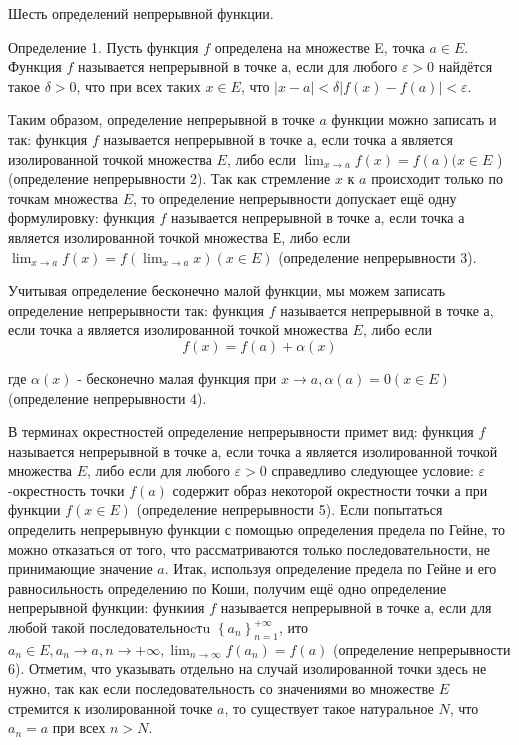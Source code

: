 \newpage
\begin{problem}
Шесть определений непрерывной функции.
\end{problem}
Определение 1. Пусть функция $f$ определена на множестве E, точка $a \in E$. Функция $f$ называется непрерывной в точке $а$, если для любого $\varepsilon>0$ найдётся такое $\delta>0$, что при всех таких $x \in E$, что $|x-a|<\delta|f(x)-f(a)|<\varepsilon$.

Таким образом, определение непрерывной в точке $a$ функции можно записать и так: функция $f$ называется непрерывной в точке а, если точка а является изолированной точкой множества $E$, либо если $\lim _{x \rightarrow a} f(x)=f(a)(x \in E$ ) (определение непрерывности 2). Так как стремление $x$ к $a$ происходит только по точкам множества $E$, то определение непрерывности допускает ещё одну формулировку: функция $f$ называется непрерывной в точке а, если точка а является изолированной точкой множества Е, либо если $\lim _{x \rightarrow a} f(x)=f\left(\lim _{x \rightarrow a} x\right)(x \in E)$ (определение непрерывности 3).

Учитывая определение бесконечно малой функции, мы можем записать определение непрерывности так: функция $f$ называется непрерывной в точке а, если точка а является изолированной точкой множества $E$, либо если
$$
f(x)=f(a)+\alpha(x)
$$

где $\alpha(x)$ - бесконечно малая функция при $x \rightarrow a, \alpha(a)=0(x \in E)$ (определение непрерывности 4).

В терминах окрестностей определение непрерывности примет вид: функция $f$ называется непрерывной в точке а, если точка а является изолированной точкой множества $E$, либо если для любого $\varepsilon>0$ справедливо следующее условие: $\varepsilon$-окрестность точки $f(a)$ содержит образ некоторой окрестности точки а при функции $f(x \in E)$ (определение непрерывности 5).
Если попытаться определить непрерывную функции с помощью определения предела по Гейне, то можно отказаться от того, что рассматриваются только последовательности, не принимающие значение $a$. Итак, используя определение предела по Гейне и его равносильность определению по Коши, получим ещё одно определение непрерывной функции: функиия $f$ называется непрерывной в точке а, если для любой такой последовательноcтu $\left\{a_n\right\}_{n=1}^{+\infty}$, ито $a_n \in E, a_n \rightarrow a, n \rightarrow+\infty, \lim _{n \rightarrow \infty} f\left(a_n\right)=f(a)$ (определение непрерывности 6). Отметим, что указывать отдельно на случай изолированной точки здесь не нужно, так как если последовательность со значениями во множестве $E$ стремится к изолированной точке $a$, то существует такое натуральное $N$, что $a_n=a$ при всех $n>N$.

